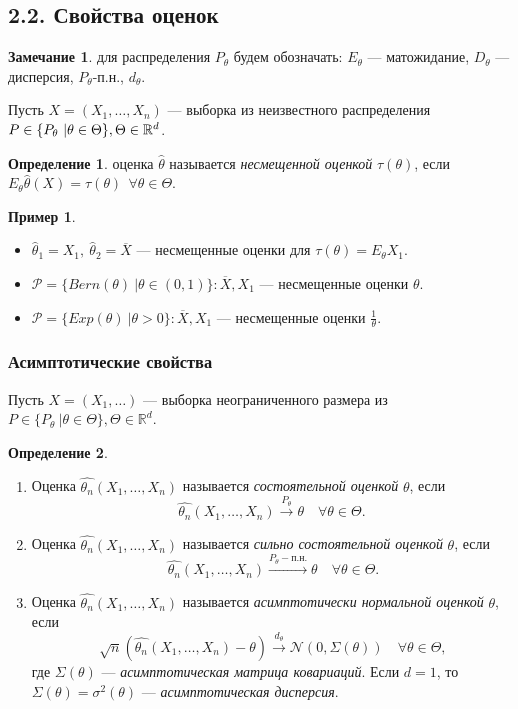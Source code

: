 \documentclass[12pt]{report}
\theoremstyle{definition}
\newtheorem{definition}{Определение}
\newtheorem{example}{Пример}
\newtheorem{remark}{Замечание}
\begin{document}
\subsection{2.2. Свойства оценок}
\begin{remark}
	для распределения $P_\theta$ будем обозначать: $E_\theta$ — матожидание, $D_\theta$ — дисперсия, $P_\theta$-п.н., $d_\theta$.
\end{remark}

Пусть $X = (X_1, \dots, X_n)$ — выборка из неизвестного распределения $\\P \in \{P_\theta \ \vert \theta \in \Theta \}, \Theta \in \mathbb{R}^d$.

\begin{definition}
	оценка $\hat{\theta}$ называется \emph{несмещенной оценкой} $\tau(\theta)$, если  $E_\theta \hat{\theta}(X) = \tau(\theta)\ \ \forall \theta \in \Theta$. 
\end{definition}
\begin{example}
	$\;$
	\begin{itemize}
		\item $\hat{\theta}_1 = X_1,\ \hat{\theta}_2 = \overline{X}$ — несмещенные оценки для $\tau(\theta) = E_\theta X_1.$
		\item $\mathcal{P} = \{Bern(\theta) \ \vert \theta \in (0, 1) \}: \overline{X}, X_1$ — несмещенные оценки $\theta$.
		\item $\mathcal{P} = \{Exp(\theta) \ \vert \theta > 0 \}: \overline{X}, X_1$ — несмещенные оценки $\frac{1}{\theta}$.
	\end{itemize}
\end{example}

\subsubsection{Асимптотические свойства}

Пусть $X = (X_1, \dots)$ — выборка неограниченного размера из $P \in \{P_\theta \ \vert \theta \in \Theta \}, \Theta \in \mathbb{R}^d$.

\begin{definition}
	$\;$
	\begin{enumerate}
		\item Оценка $\hat{\theta_n}(X_1, \dots, X_n)$ называется \emph{состоятельной оценкой} $\theta$, если $$\hat{\theta_n}(X_1, \dots, X_n) \xrightarrow{P_\theta} \theta \quad \forall \theta \in \Theta.$$
		\item Оценка $\hat{\theta_n}(X_1, \dots, X_n)$ называется \emph{сильно состоятельной оценкой} $\theta$, если $$\ \hat{\theta_n}(X_1, \dots, X_n) \xrightarrow{P_\theta-п.н.} \theta \quad \forall \theta \in \Theta.$$
		\item Оценка $\hat{\theta_n}(X_1, \dots, X_n)$ называется \emph{асимптотически нормальной оценкой} $\theta$, если $$\ \sqrt{n}(\hat{\theta_n}(X_1, \dots, X_n) - \theta) \xrightarrow{d_\theta} \mathcal{N}(0, \Sigma(\theta)) \quad \forall \theta \in \Theta,$$
		где $\Sigma(\theta)$ — \emph{асимптотическая матрица ковариаций}.
		Если $d=1$, то $\Sigma(\theta) = \sigma^2(\theta)$ — \emph{асимптотическая дисперсия}.
	\end{enumerate}
\end{definition}
\end{document}
